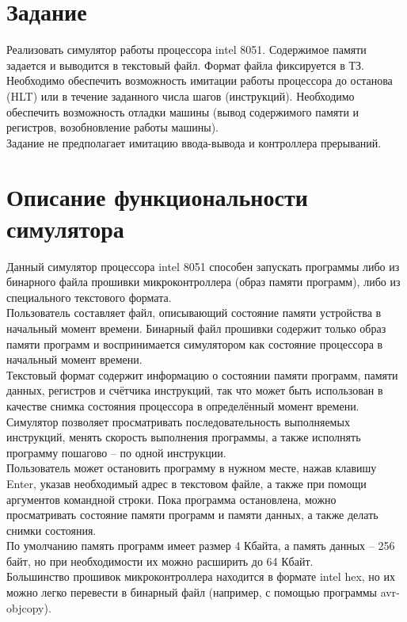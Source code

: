





\large



\setcounter{page}{2}

\tableofcontents
\newpage


\section{Задание}
Реализовать симулятор работы процессора intel 8051. Содержимое памяти задается и выводится в текстовый файл. Формат файла фиксируется в ТЗ. \\
Необходимо обеспечить возможность имитации работы процессора до останова (HLT) или в течение заданного числа шагов (инструкций). Необходимо обеспечить возможность отладки машины (вывод содержимого памяти и регистров, возобновление работы машины). \\
Задание не предполагает имитацию ввода-вывода и контроллера прерываний.

\section{Описание функциональности симулятора}
Данный симулятор процессора intel 8051 способен запускать программы либо из бинарного файла прошивки микроконтроллера (образ памяти программ), либо из специального текстового формата. \\
Пользователь составляет файл, описывающий состояние памяти устройства в начальный момент времени. Бинарный файл прошивки содержит только образ памяти программ и воспринимается симулятором как состояние процессора в начальный момент времени. \\
Текстовый формат содержит информацию о состоянии памяти программ, памяти данных, регистров и счётчика инструкций, так что может быть использован в качестве снимка состояния процессора в определённый момент времени. \\
Симулятор позволяет просматривать последовательность выполняемых инструкций, менять скорость выполнения программы, а также исполнять программу пошагово -- по одной инструкции. \\
Пользователь может остановить программу в нужном месте, нажав клавишу Enter, указав необходимый адрес в текстовом файле, а также при помощи аргументов командной строки. Пока программа остановлена, можно просматривать состояние памяти программ и памяти данных, а также делать снимки состояния. \\
По умолчанию память программ имеет размер 4 Кбайта, а память данных -- 256 байт, но при необходимости их можно расширить до 64 Кбайт. \\
Большинство прошивок микроконтроллера находится в формате intel hex, но их можно легко перевести в бинарный файл (например, с помощью программы avr-objcopy).

